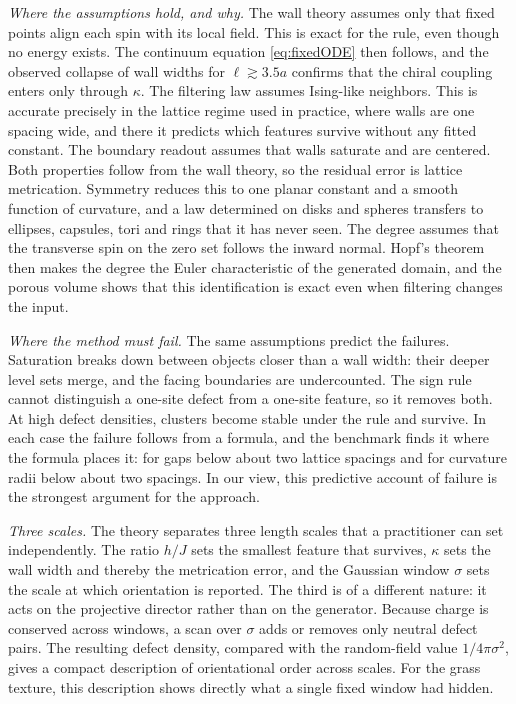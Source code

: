 \documentclass[11pt,a4paper]{article}
\begin{document}
\emph{Where the assumptions hold, and why.} The wall theory assumes only that fixed points align each spin with its local field. This is exact for the rule, even though no energy exists. The continuum equation \eqref{eq:fixedODE} then follows, and the observed collapse of wall widths for $\ell\gtrsim3.5a$ confirms that the chiral coupling enters only through $\kappa$. The filtering law assumes Ising-like neighbors. This is accurate precisely in the lattice regime used in practice, where walls are one spacing wide, and there it predicts which features survive without any fitted constant. The boundary readout assumes that walls saturate and are centered. Both properties follow from the wall theory, so the residual error is lattice metrication. Symmetry reduces this to one planar constant and a smooth function of curvature, and a law determined on disks and spheres transfers to ellipses, capsules, tori and rings that it has never seen. The degree assumes that the transverse spin on the zero set follows the inward normal. Hopf's theorem then makes the degree the Euler characteristic of the generated domain, and the porous volume shows that this identification is exact even when filtering changes the input.

\emph{Where the method must fail.} The same assumptions predict the failures. Saturation breaks down between objects closer than a wall width: their deeper level sets merge, and the facing boundaries are undercounted. The sign rule cannot distinguish a one-site defect from a one-site feature, so it removes both. At high defect densities, clusters become stable under the rule and survive. In each case the failure follows from a formula, and the benchmark finds it where the formula places it: for gaps below about two lattice spacings and for curvature radii below about two spacings. In our view, this predictive account of failure is the strongest argument for the approach.

\emph{Three scales.} The theory separates three length scales that a practitioner can set independently. The ratio $h/J$ sets the smallest feature that survives, $\kappa$ sets the wall width and thereby the metrication error, and the Gaussian window $\sigma$ sets the scale at which orientation is reported. The third is of a different nature: it acts on the projective director rather than on the generator. Because charge is conserved across windows, a scan over $\sigma$ adds or removes only neutral defect pairs. The resulting defect density, compared with the random-field value $1/4\pi\sigma^2$, gives a compact description of orientational order across scales. For the grass texture, this description shows directly what a single fixed window had hidden.
\end{document}
